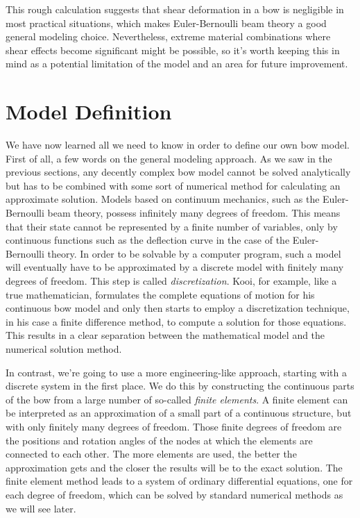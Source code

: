 This rough calculation suggests that shear deformation in a bow is negligible in most practical situations, which makes Euler-Bernoulli beam theory a good general modeling choice.
Nevertheless, extreme material combinations where shear effects become significant might be possible, so it's worth keeping this in mind as a potential limitation of the model and an area for future improvement.

\newpage
\section{Model Definition}

We have now learned all we need to know in order to define our own bow model.
First of all, a few words on the general modeling approach.
As we saw in the previous sections, any decently complex bow model cannot be solved analytically but has to be combined with some sort of numerical method for calculating an approximate solution.
Models based on continuum mechanics, such as the Euler-Bernoulli beam theory, possess infinitely many degrees of freedom.
This means that their state cannot be represented by a finite number of variables, only by continuous functions such as the deflection curve in the case of the Euler-Bernoulli theory.
In order to be solvable by a computer program, such a model will eventually have to be approximated by a discrete model with finitely many degrees of freedom.
This step is called \textit{discretization}.
Kooi, for example, like a true mathematician, formulates the complete equations of motion for his continuous bow model and only then starts to employ a discretization technique, in his case a finite difference method, to compute a solution for those equations.
This results in a clear separation between the mathematical model and the numerical solution method.

In contrast, we're going to use a more engineering-like approach, starting with a discrete system in the first place.
We do this by constructing the continuous parts of the bow from a large number of so-called \textit{finite elements}.
A finite element can be interpreted as an approximation of a small part of a continuous structure, but with only finitely many degrees of freedom.
Those finite degrees of freedom are the positions and rotation angles of the nodes at which the elements are connected to each other.
The more elements are used, the better the approximation gets and the closer the results will be to the exact solution.
The finite element method leads to a system of ordinary differential equations, one for each degree of freedom, which can be solved by standard numerical methods as we will see later.

